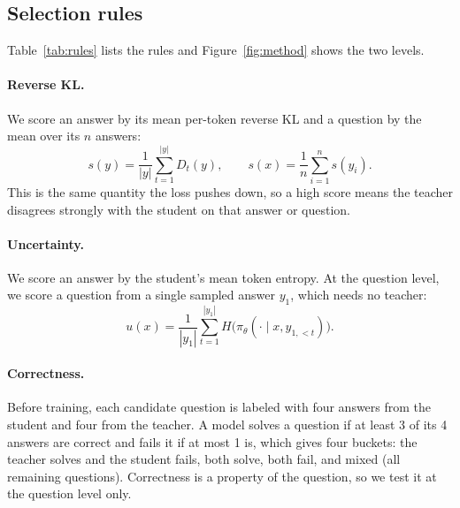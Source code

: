 \documentclass[11pt]{article}
\begin{document}
\subsection{Selection rules}
Table~\ref{tab:rules} lists the rules and Figure~\ref{fig:method} shows the two levels.

\paragraph{Reverse KL.} We score an answer by its mean per-token reverse KL and a question by the mean over its $n$ answers:
\begin{equation}
s(y) = \frac{1}{|y|} \sum_{t=1}^{|y|} D_t(y), \qquad s(x) = \frac{1}{n} \sum_{i=1}^{n} s(y_i).
\end{equation}
This is the same quantity the loss pushes down, so a high score means the teacher disagrees strongly with the student on that answer or question.

\paragraph{Uncertainty.} We score an answer by the student's mean token entropy.
At the question level, we score a question from a single sampled answer $y_1$, which needs no teacher:
\begin{equation}
u(x) = \frac{1}{|y_1|} \sum_{t=1}^{|y_1|} H\big(\pi_\theta(\cdot \mid x, y_{1,<t})\big).
\end{equation}

\paragraph{Correctness.} Before training, each candidate question is labeled with four answers from the student and four from the teacher.
A model solves a question if at least 3 of its 4 answers are correct and fails it if at most 1 is, which gives four buckets: the teacher solves and the student fails, both solve, both fail, and mixed (all remaining questions).
Correctness is a property of the question, so we test it at the question level only.
\end{document}
